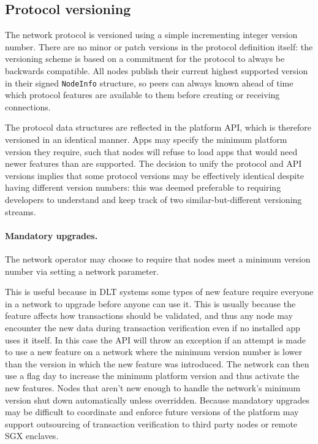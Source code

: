\documentclass{article}
\begin{document}
\subsection{Protocol versioning}\label{subsec:protocol-versioning}

The network protocol is versioned using a simple incrementing integer version number. There are no minor or patch
versions in the protocol definition itself: the versioning scheme is based on a commitment for the protocol
to always be backwards compatible. All nodes publish their current highest supported version in their signed
\texttt{NodeInfo} structure, so peers can always known ahead of time which protocol features are available to them
before creating or receiving connections.

The protocol data structures are reflected in the platform API, which is therefore versioned in an identical
manner. Apps may specify the minimum platform version they require, such that nodes will refuse to load apps that
would need newer features than are supported. The decision to unify the protocol and API versions implies that some
protocol versions may be effectively identical despite having different version numbers: this was deemed preferable
to requiring developers to understand and keep track of two similar-but-different versioning streams.

\paragraph{Mandatory upgrades.}The network operator may choose to require that nodes meet a minimum version number
via setting a network parameter.

This is useful because in DLT systems some types of new feature require everyone in a network to upgrade before
anyone can use it. This is usually because the feature affects how transactions should be validated, and thus any
node may encounter the new data during transaction verification even if no installed app uses it itself. In this
case the API will throw an exception if an attempt is made to use a new feature on a network where the minimum
version number is lower than the version in which the new feature was introduced. The network can then use a flag
day to increase the minimum platform version and thus activate the new features. Nodes that aren't new
enough to handle the network's minimum version shut down automatically unless overridden. Because mandatory
upgrades may be difficult to coordinate and enforce future versions of the platform may support outsourcing of
transaction verification to third party nodes or remote SGX enclaves.
\end{document}
